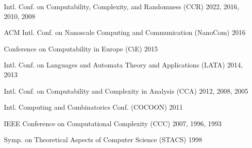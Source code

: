 \documentclass[12pt]{article}
\begin{document}
\vspace{0.2cm}


\indent
Intl. Conf. on Computability, Complexity, and Randomness (CCR) 2022, 2016, 2010, 2008

\indent
ACM Intl. Conf. on Nanoscale Computing and Communication (NanoCom) 2016

\indent Conference on Computability in Europe (CiE) 2015

\indent Intl. Conf. on Languages and Automata Theory and Applications (LATA) 2014, 2013

\indent
Intl. Conf. on Computability and Complexity in Analysis (CCA) 2012, 2008, 2005

\indent
Intl. Computing and Combinatorics Conf. (COCOON) 2011

\indent 
IEEE Conference on Computational Complexity (CCC) 2007, 1996, 1993

\indent
Symp. on Theoretical Aspects of Computer Science (STACS) 1998
\end{document}
